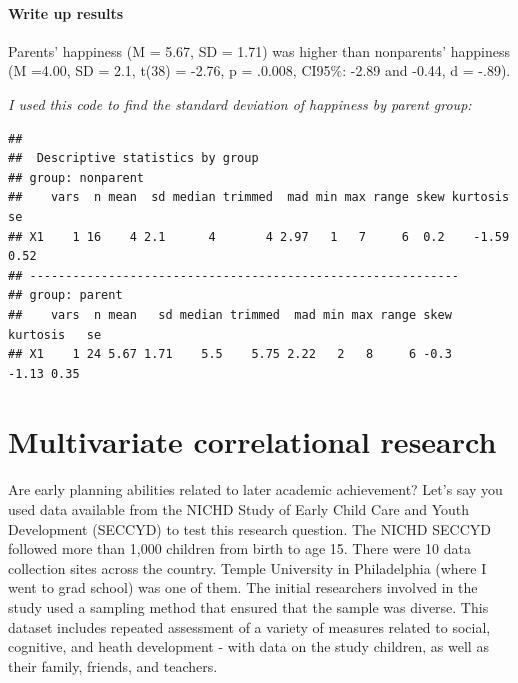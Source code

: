 \documentclass[
]{book}
\newenvironment{Shaded}{\begin{snugshade}}{\end{snugshade}}
\newcommand{\KeywordTok}[1]{\textcolor[rgb]{0.13,0.29,0.53}{\textbf{#1}}}
\newcommand{\NormalTok}[1]{#1}
\newcommand{\OperatorTok}[1]{\textcolor[rgb]{0.81,0.36,0.00}{\textbf{#1}}}
\newcommand{\StringTok}[1]{\textcolor[rgb]{0.31,0.60,0.02}{#1}}
\begin{document}
\hypertarget{write-up-results-1}{%
\subsubsection{Write up results}\label{write-up-results-1}}

Parents' happiness (M = 5.67, SD = 1.71) was higher than nonparents' happiness (M =4.00, SD = 2.1, t(38) = -2.76, p = .0.008, CI95\%: -2.89 and -0.44, d = -.89).

\emph{I used this code to find the standard deviation of happiness by parent group:}

\begin{Shaded}
\end{Shaded}

\begin{verbatim}
## 
##  Descriptive statistics by group 
## group: nonparent
##    vars  n mean  sd median trimmed  mad min max range skew kurtosis   se
## X1    1 16    4 2.1      4       4 2.97   1   7     6  0.2    -1.59 0.52
## ------------------------------------------------------------ 
## group: parent
##    vars  n mean   sd median trimmed  mad min max range skew kurtosis   se
## X1    1 24 5.67 1.71    5.5    5.75 2.22   2   8     6 -0.3    -1.13 0.35
\end{verbatim}

\hypertarget{multivariate-correlational-research}{%
\chapter{Multivariate correlational research}\label{multivariate-correlational-research}}

Are early planning abilities related to later academic achievement? Let's say you used data available from the NICHD Study of Early Child Care and Youth Development (SECCYD) to test this research question. The NICHD SECCYD followed more than 1,000 children from birth to age 15. There were 10 data collection sites across the country. Temple University in Philadelphia (where I went to grad school) was one of them. The initial researchers involved in the study used a sampling method that ensured that the sample was diverse. This dataset includes repeated assessment of a variety of measures related to social, cognitive, and heath development - with data on the study children, as well as their family, friends, and teachers.
\end{document}
